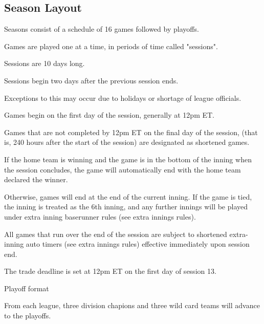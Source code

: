 
\subsection{Season Layout}
\begin{deepEnumerate}
	\item Seasons consist of a schedule of 16 games followed by playoffs.
	\item Games are played one at a time, in periods of time called "sessions".
	\begin{deepEnumerate}
		\item Sessions are 10 days long.
		\item Sessions begin two days after the previous session ends.
		\begin{deepEnumerate}
			\item Exceptions to this may occur due to holidays or shortage of league officials.
		\end{deepEnumerate}
		\item Games begin on the first day of the session, generally at 12pm ET.
		\item Games that are not completed by 12pm ET on the final day of the session,
		(that is, 240 hours after the start of the session)
		are designated as shortened games.
		\begin{deepEnumerate}
			\item If the home team is winning 
			and the game is in the bottom of the inning
			when the session concludes,
			the game will automatically end with the home team declared the winner.
			\item Otherwise, games will end at the end of the current inning.
			If the game is tied, the inning is treated as the 6th inning,
			and any further innings will be played under extra inning baserunner rules
			(see extra innings rules). %
			\item All games that run over the end of the session 
			are subject to shortened extra-inning auto timers
			(see extra innings rules) %
			effective immediately upon session end.
		\end{deepEnumerate}
		\item The trade deadline is set at 12pm ET on the first day of session 13.
		\item Playoff format
		\begin{deepEnumerate}
			\item From each league, three division chapions and three wild card teams will advance to the playoffs.

\end{deepEnumerate}
\end{deepEnumerate}
\end{deepEnumerate}
